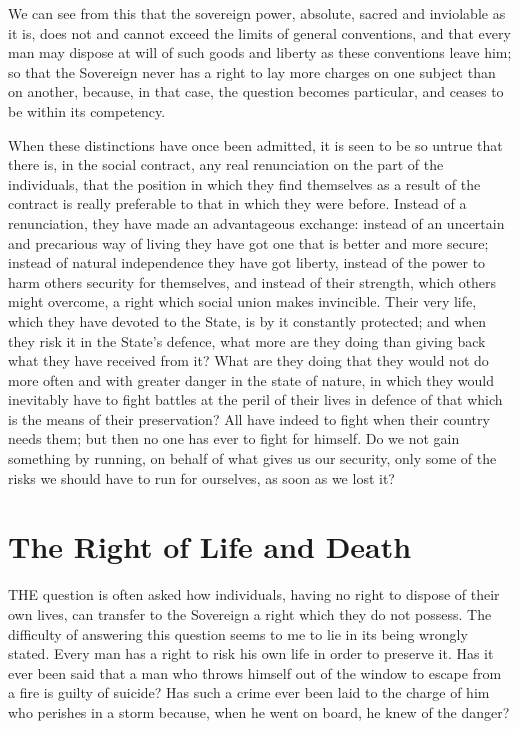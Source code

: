 \documentclass[12pt]{report}
\begin{document}
We can see from this that the sovereign power, absolute, sacred and inviolable as it is, does not and cannot exceed the limits of general conventions, and that every man may dispose at will of such goods and liberty as these conventions leave him; so that the Sovereign never has a right to lay more charges on one subject than on another, because, in that case, the question becomes particular, and ceases to be within its competency.

When these distinctions have once been admitted, it is seen to be so untrue that there is, in the social contract, any real renunciation on the part of the individuals, that the position in which they find themselves as a result of the contract is really preferable to that in which they were before. Instead of a renunciation, they have made an advantageous exchange: instead of an uncertain and precarious way of living they have got one that is better and more secure; instead of natural independence they have got liberty, instead of the power to harm others security for themselves, and instead of their strength, which others might overcome, a right which social union makes invincible. Their very life, which they have devoted to the State, is by it constantly protected; and when they risk it in the State's defence, what more are they doing than giving back what they have received from it? What are they doing that they would not do more often and with greater danger in the state of nature, in which they would inevitably have to fight battles at the peril of their lives in defence of that which is the means of their preservation? All have indeed to fight when their country needs them; but then no one has ever to fight for himself. Do we not gain something by running, on behalf of what gives us our security, only some of the risks we should have to run for ourselves, as soon as we lost it?

\section{The Right of Life and Death}
THE question is often asked how individuals, having no right to dispose of their own lives, can transfer to the Sovereign a right which they do not possess. The difficulty of answering this question seems to me to lie in its being wrongly stated. Every man has a right to risk his own life in order to preserve it. Has it ever been said that a man who throws himself out of the window to escape from a fire is guilty of suicide? Has such a crime ever been laid to the charge of him who perishes in a storm because, when he went on board, he knew of the danger?
\end{document}
